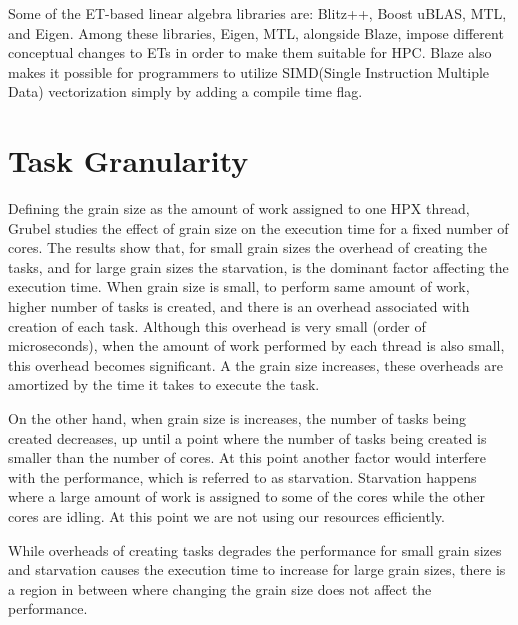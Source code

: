 Some of the ET-based linear algebra libraries are: Blitz++\cite{Blitz}, Boost uBLAS\cite{ublas}, MTL\cite{MTL}, and Eigen\cite{guennebaud2010eigen}. Among these libraries, Eigen, MTL, alongside Blaze, impose different conceptual changes to ETs in order to make them suitable for HPC.    
Blaze also makes it possible for programmers to utilize SIMD(Single Instruction Multiple Data) vectorization simply by adding a compile time flag.

\vspace{\baselineskip}
\section{Task Granularity}\label{task}
Defining the grain size as the amount of work assigned to one HPX thread, Grubel\cite{grubel2015performance} studies the effect of grain size on the execution time for a fixed number of cores. The results show that, for small grain sizes the overhead of creating the tasks, and for large grain sizes the starvation, is the dominant factor affecting the execution time\cite{grubel2015performance}. When grain size is small, to perform same amount of work, higher number of tasks is created, and there is an overhead associated with creation of each task. Although this overhead is very small (order of microseconds), when the amount of work performed by each thread is also small, this overhead becomes significant. A the grain size increases, these overheads are amortized by the time it takes to execute the task. 

On the other hand, when grain size is increases, the number of tasks being created decreases, up until a point where the number of tasks being created is smaller than the number of cores. At this point another factor would interfere with the performance, which is referred to as starvation. Starvation happens where a large amount of work is assigned to some of the cores while the other cores are idling. At this point we are not using our resources efficiently. 

While overheads of creating tasks degrades the performance for small grain sizes and starvation causes the execution time to increase for large grain sizes, there is a region in between where changing the grain size does not affect the performance. 

